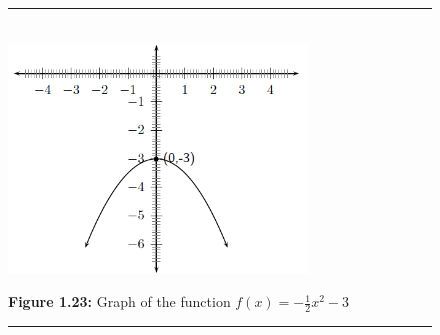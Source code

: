 \setcounter{subfigure}{0}
\begin{figure}[H] %
\begin{center}
\rule[.1in]{\figurerulewidth}{.005in} \\
\label{m39345*uid129!!!underscore!!!media}\label{m39345*uid129!!!underscore!!!printimage}\includegraphics[width=300px]{col11306.imgs/m39345_MG10C11_019.png} %
\vspace{2pt}
\vspace{\rubberspace}\par \begin{cnxcaption}
\small \textbf{Figure 1.23: }Graph of the function $f(x)=-\frac{1}{2}{x}^{2}-3$
\end{cnxcaption}
\vspace{.1in}
\rule[.1in]{\figurerulewidth}{.005in} \\
\end{center}
\end{figure}       
\par
\label{m39345*eid7523}\vspace{.5cm} 
\noindent
